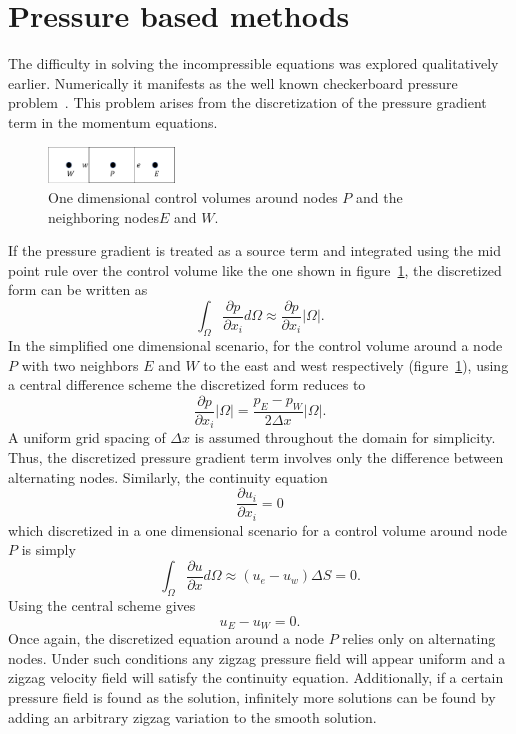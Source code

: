 \section{Pressure based methods}

The difficulty in solving the incompressible equations was explored qualitatively earlier. Numerically it manifests as the well known checkerboard pressure problem~\cite{Patankar1980,Moukalled}. This problem arises from the discretization of the pressure gradient term in the momentum equations. 
\begin{figure}[h]
\centering
\captionsetup{justification=centering}
 \includegraphics[width=0.3\textwidth]{ch2_litsurvey/Figures/1ddomain.png}
\caption{One dimensional control volumes around nodes $P$ and the neighboring nodes$E$ and $W$.}
 \label{fig:1dCV}
\end{figure}
If the pressure gradient is treated as a source term and integrated using the mid point rule over the control volume like the one shown in figure~\ref{fig:1dCV}, the discretized form can be written as 
\begin{equation}
\int_{\Omega} \frac{\partial p}{\partial x_i} d\Omega \approx \frac{\partial p}{\partial x_i}|\Omega|.
\end{equation}
In the simplified one dimensional scenario, for the control volume around a node $P$ with two neighbors $E$ and $W$ to the east and west respectively (figure~\ref{fig:1dCV}), using a central difference scheme the discretized form reduces to 
\begin{equation}
\frac{\partial p}{\partial x_i}|\Omega| = \frac{p_E - p_W}{2\Delta x}|\Omega|.
\end{equation}
A uniform grid spacing of $\Delta x$ is assumed throughout the domain for simplicity. Thus, the discretized pressure gradient term involves only the difference between alternating nodes. Similarly, the continuity equation
\begin{equation}
\frac{\partial u_i}{\partial x_i} = 0
\end{equation}
which discretized in a one dimensional scenario for a control volume around node $P$ is simply
\begin{equation}
\int_{\Omega}\frac{\partial u}{\partial x} d\Omega \approx (u_e - u_w)\Delta S = 0.
\end{equation}
Using the central scheme gives
\begin{equation}
u_E - u_W = 0.
\end{equation}
Once again, the discretized equation around a node $P$ relies only on alternating nodes. Under such conditions any zigzag pressure field will appear uniform and a zigzag velocity field will satisfy the continuity equation. Additionally, if a certain pressure field is found as the solution, infinitely more solutions can be found by adding an arbitrary zigzag variation to the smooth solution.

